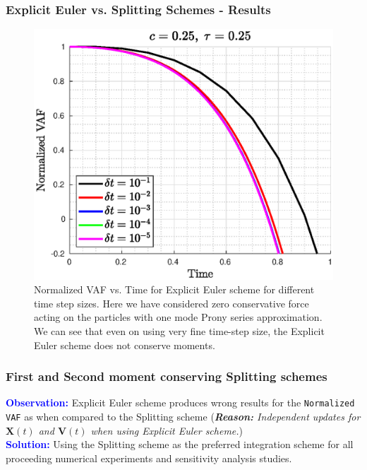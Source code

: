 \documentclass[a4paper,10pt]{beamer}
\newcommand{\BS}[1]{\boldsymbol{#1}}
\begin{document}
	\begin{frame}
		\frametitle{Explicit Euler vs. Splitting Schemes - Results}
		\begin{figure}[H]
			\includegraphics[width=0.75\linewidth]{./Plots/timeStepVariation/timeVariation.eps}
			\caption{\footnotesize Normalized VAF vs. Time for Explicit Euler scheme for different time step sizes. Here we have considered zero conservative force acting on the particles with one mode Prony series approximation. We can see that even on using very fine time-step size, the Explicit Euler scheme does not conserve moments.}
		\end{figure}
	\end{frame}
	
	\begin{frame}
		\frametitle{\large First and Second moment conserving Splitting schemes}
		\large
		\textcolor{blue}{\textbf{Observation:}}
		{Explicit Euler scheme produces wrong results for the \texttt{Normalized VAF} as when compared to the Splitting scheme} (\textit{\textbf{Reason:} Independent updates for $\BS{X}(t)$ and $\BS{V}(t)$ when using Explicit Euler scheme.}) \\
		\vspace{0.25cm}
		\textcolor{blue}{\textbf{Solution:}}
		{Using the Splitting scheme as the preferred integration scheme for all proceeding numerical experiments and sensitivity analysis studies.}
	\end{frame}
	
\end{document}
